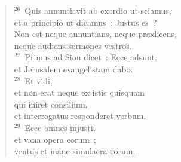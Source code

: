 \begin{flushleft}
\begin{verse}
${}^{26}$~Quis annuntiavit ab exordio ut sciamus,\\ et a principio ut dicamus~: Justus es~?\\ Non est neque annuntians, neque pr\ae dicens,\\ neque audiens sermones vestros.\\
${}^{27}$~Primus ad Sion dicet~: Ecce adsunt,\\ et Jerusalem evangelistam dabo.\\
${}^{28}$~Et vidi,\\ et non erat neque ex istis quisquam\\ qui iniret consilium,\\ et interrogatus responderet verbum.\\
${}^{29}$~Ecce omnes injusti,\\ et vana opera eorum~;\\ ventus et inane simulacra eorum.\end{verse}\end{flushleft}


